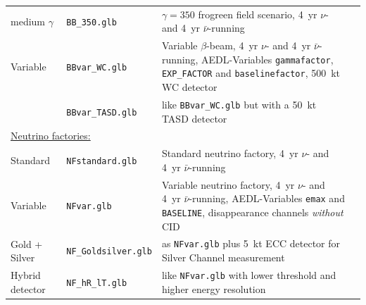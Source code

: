 \begin{table}[tbp]
\begin{center}
\begin{tabular}{llp{7.5cm}c}
medium $\gamma$ & {\tt BB\_350.glb} & $\gamma=350$ frogreen field scenario, 4~yr $\nu$- and
4~yr $\bar{\nu}$-running & \cite{Burguet-Castell:2005pa} \\[0.2cm]

Variable & {\tt BBvar\_WC.glb} & Variable $\beta$-beam, 4~yr $\nu$- and 
4~yr $\bar{\nu}$-running, {\sf AEDL}-Variables {\tt gammafactor}, 
{\tt EXP\_FACTOR} and {\tt baselinefactor}, 500~kt WC detector & \cite{Huber:2005jk} \\[0.2cm]

	& {\tt BBvar\_TASD.glb} & like {\tt BBvar\_WC.glb} but with a 50~kt TASD detector  
& \cite{Huber:2005jk} \\[0.2cm]

\multicolumn{4}{l}{\underline{Neutrino factories:}} \\[0.2cm]

Standard & {\tt NFstandard.glb} & Standard neutrino factory, 
4~yr $\nu$- and 4~yr $\bar{\nu}$-running & \cite{Huber:2002mx} \\[0.2cm]

Variable  & {\tt NFvar.glb} & Variable neutrino factory, 4~yr 
$\nu$- and 4~yr $\bar{\nu}$-running, {\sf AEDL}-Variables {\tt emax} and {\tt BASELINE}, disappearance channels
{\em without} CID & \cite{Huber:2002mx,Huber:2006wb}  \\[0.2cm]

Gold + Silver & {\tt NF\_Goldsilver.glb} & as {\tt NFvar.glb} 
plus 5~kt ECC detector for Silver Channel
measurement & \cite{Huber:2002mx,Huber:2006wb,Autiero:2003fu} \\[0.2cm]

Hybrid detector & {\tt NF\_hR\_lT.glb} & like {\tt NFvar.glb} 
with lower threshold and higher energy resolution & \cite{Huber:2002mx,Huber:2006wb} \\[0.2cm]

\hline
\end{tabular}
\end{center}
\end{table}

